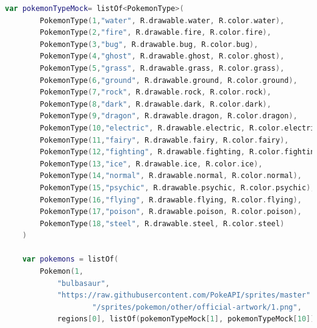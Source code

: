 \documentclass[a4paper, 12pt]{article}
\begin{document}
\begin{lstlisting}[caption={PokemonMockData Object.}, label={code:mockData}, language=Kotlin]
    var pokemonTypeMock= listOf<PokemonType>(
        PokemonType(1,"water", R.drawable.water, R.color.water),
        PokemonType(2,"fire", R.drawable.fire, R.color.fire),
        PokemonType(3,"bug", R.drawable.bug, R.color.bug),
        PokemonType(4,"ghost", R.drawable.ghost, R.color.ghost),
        PokemonType(5,"grass", R.drawable.grass, R.color.grass),
        PokemonType(6,"ground", R.drawable.ground, R.color.ground),
        PokemonType(7,"rock", R.drawable.rock, R.color.rock),
        PokemonType(8,"dark", R.drawable.dark, R.color.dark),
        PokemonType(9,"dragon", R.drawable.dragon, R.color.dragon),
        PokemonType(10,"electric", R.drawable.electric, R.color.electric),
        PokemonType(11,"fairy", R.drawable.fairy, R.color.fairy),
        PokemonType(12,"fighting", R.drawable.fighting, R.color.fighting),
        PokemonType(13,"ice", R.drawable.ice, R.color.ice),
        PokemonType(14,"normal", R.drawable.normal, R.color.normal),
        PokemonType(15,"psychic", R.drawable.psychic, R.color.psychic),
        PokemonType(16,"flying", R.drawable.flying, R.color.flying),
        PokemonType(17,"poison", R.drawable.poison, R.color.poison),
        PokemonType(18,"steel", R.drawable.steel, R.color.steel)
    )

    var pokemons = listOf(
        Pokemon(1,
            "bulbasaur",
            "https://raw.githubusercontent.com/PokeAPI/sprites/master" +
                    "/sprites/pokemon/other/official-artwork/1.png",
            regions[0], listOf(pokemonTypeMock[1], pokemonTypeMock[10])


\end{lstlisting}
\end{document}
